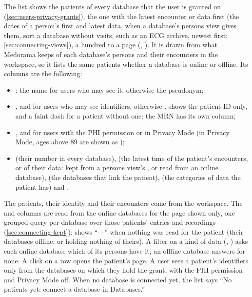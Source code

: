 The list shows the patients of every database that the user is granted  on
(\cref{sec:users-privacy-grants}), the one with the latest encounter or data first (the dates
of a person's first and latest data, when a database's persons view gives them, sort a database
without visits, such as an ECG archive, newest first; \cref{sec:connecting-views}), a hundred to a page
(, ). It is drawn from what Medorama keeps of each
database's persons and their encounters in the workspace, so it lists the same patients whether
a database is online or offline. Its columns are the following:
\begin{itemize}
\item {}: the name\phimark{} for users who may see it, otherwise the pseudonym;
\item {}, \phimark{} and \phimark{} for users who may see
  identifiers, otherwise .  shows the patient ID only, and a faint
  dash for a patient without one: the MRN has its own column;
\item {}, and  for users with the PHI permission or in Privacy Mode (in Privacy
  Mode, ages above 89 are shown as );
\item {} (their number in every database),  (the latest time of the
  patient's encounters, or of their data: kept from a persons view's , or read
  from an online database),  (the databases
  that link the patient),  (the categories of data the patient has) and .
\end{itemize}
The patients, their identity and their encounters come from the workspace. The  and
 columns are read from the online databases for the page shown only, one grouped
query per database over those patients' entries and recordings (\cref{sec:connecting-kept});
 shows ``---'' when nothing was read for the patient (their databases offline, or
holding nothing of theirs). A filter on a kind of data (, ) asks
each online database which of its persons have it; an offline database answers for none.
A click on a row opens the patient's page. A user sees a patient's identifiers only from the
databases on which they hold the  grant, with the PHI permission and Privacy Mode off.
When no database is connected yet, the list says ``No patients yet: connect a database in
Databases.''

